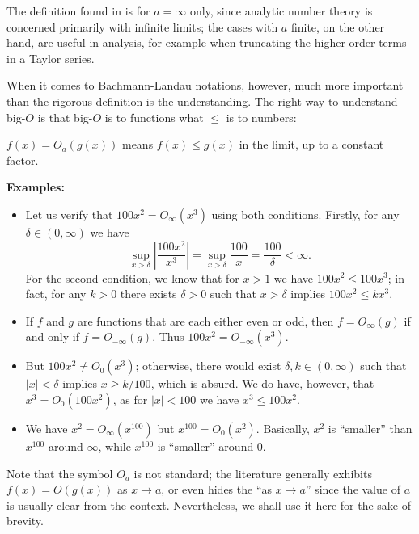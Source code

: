 \documentclass{article}
\theoremstyle{definition}
\newcommand\abs[1]{\left\lvert#1\right\rvert}
\begin{document}
The definition found in \cite{Landau1909} is for \(a=\infty\) only, since analytic number theory is concerned primarily with infinite limits; the cases with \(a\) finite, on the other hand, are useful in analysis, for example when truncating the higher order terms in a Taylor series.

When it comes to Bachmann-Landau notations, however, much more important than the rigorous definition is the understanding.
The right way to understand big-$O$ is that big-$O$ is to functions what \(\le\) is to numbers:
\begin{center}
    \(f(x) = O_a(g(x))\) means \(f(x) \le g(x)\) in the limit, up to a constant factor.
\end{center}

\textbf{Examples:}

\begin{itemize}
    \item Let us verify that \(100x^2 = O_{\infty}(x^3)\) using both conditions.
        Firstly, for any \(\delta\in(0,\infty)\) we have
        \[\sup_{x>\delta}\abs{\frac{100x^2}{x^3}} = \sup_{x>\delta}\frac{100}{x} = \frac{100}{\delta} < \infty.\]
        For the second condition, we know that for \(x>1\) we have \(100x^2 \leq 100x^3\); in fact, for any \(k>0\) there exists \(\delta>0\) such that \(x>\delta\) implies \(100x^2 \leq kx^3\).
        
    \item If \(f\) and \(g\) are functions that are each either even or odd, then \(f = O_{\infty}(g)\) if and only if \(f = O_{-\infty}(g)\).
        Thus \(100x^2 = O_{-\infty}(x^3)\).

    \item But \(100x^2 \ne O_0(x^3)\); otherwise, there would exist \(\delta,k\in(0,\infty)\) such that \(\abs x < \delta\) implies \(x \geq k/100\), which is absurd.
    We do have, however, that \(x^3 = O_0(100x^2)\), as for \(\abs x < 100\) we have \(x^3 \leq 100x^2\).

    \item We have \(x^2 = O_{\infty}(x^{100})\) but \(x^{100} = O_0(x^2)\).
        Basically, \(x^2\) is ``smaller'' than \(x^{100}\) around \(\infty\), while \(x^{100}\) is ``smaller'' around \(0\).
\end{itemize}

Note that the symbol \(O_a\) is not standard; the literature generally exhibits \(f(x) = O(g(x))\) as \(x\to a\), or even hides the ``as \(x\to a\)'' since the value of \(a\) is usually clear from the context.
Nevertheless, we shall use it here for the sake of brevity.
\end{document}
